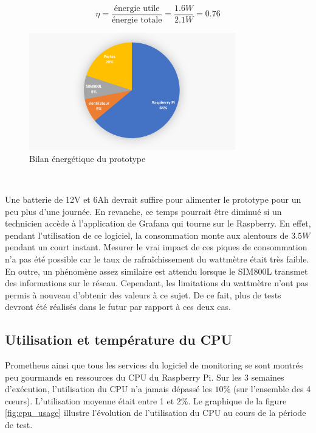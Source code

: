 \begin{equation}
  \eta = \frac{\text{énergie utile}}{\text{énergie totale}} = \frac{1.6W}{2.1W} = 0.76
  \label{eq:conso}
\end{equation}

\begin{figure}[ht!]
  \centering
  \includegraphics[width=0.8\textwidth]{img/tests/pie_chart.png}
  \caption{Bilan énergétique du prototype}
  \label{eq:pie}
\end{figure}

~

\noindent
Une batterie de 12V et 6Ah devrait suffire pour alimenter le prototype pour un peu plus d'une journée. En revanche, ce temps pourrait être diminué si un technicien accède à l'application de Grafana qui tourne sur le Raspberry. En effet, pendant l'utilisation de ce logiciel, la consommation monte aux alentours de $3.5W$ pendant un court instant. Mesurer le vrai impact de ces piques de consommation n'a pas été possible car le taux de rafraîchissement du wattmètre était très faible. En outre, un phénomène assez similaire est attendu lorsque le SIM800L transmet des informations sur le réseau. Cependant, les limitations du wattmètre n'ont pas permis à nouveau d'obtenir des valeurs à ce sujet. De ce fait, plus de tests devront été réalisés dans le futur par rapport à ces deux cas.

\subsection{Utilisation et température du CPU}

\noindent
Prometheus ainsi que tous les services du logiciel de monitoring se sont montrés peu gourmands en ressources du CPU du Raspberry Pi. Sur les 3 semaines d'exécution, l'utilisation du CPU n'a jamais dépassé les $10\%$ (sur l'ensemble des 4 cœurs). L'utilisation moyenne était entre 1 et $2\%$. Le graphique de la figure \ref{fig:cpu_usage} illustre l'évolution de l'utilisation du CPU au cours de la période de test.

